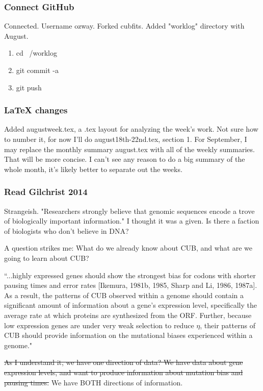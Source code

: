 \documentclass[11pt]{article} %
\begin{document}
\subsubsection{Connect GitHub}

Connected. Username ozway. Forked cubfits. Added "worklog" directory with August.

\begin{enumerate}
\item cd ~/worklog
\item git commit -a
\item git push
\end{enumerate}

\subsubsection{LaTeX changes}
Added augustweek.tex, a .tex layout for analyzing the week's work. Not sure how to number it, for now I'll do august18th-22nd.tex, section 1.
For September, I may replace the monthly summary august.tex with all of the weekly summaries. That will be more concise. I can't see any reason to do a big summary of the whole month, it's likely better to separate out the weeks.

\subsubsection{Read Gilchrist 2014}
Strangeish. "Researchers strongly believe that genomic sequences encode a trove of biologically important information." I thought it was a given. Is there a faction of biologists who don't believe in DNA?

A question strikes me: What do we already know about CUB, and what are we going to learn about CUB? 

``...highly expressed genes should show the strongest bias for codons with shorter pausing times and error rates [Ikemura, 1981b, 1985, Sharp and Li, 1986, 1987a]. As a result, the patterns of CUB observed within a genome should contain a significant amount of information about a gene’s expression level, specifically the average rate at which proteins are synthesized from the ORF. Further, because low expression genes are under very weak selection to reduce $\eta$, their patterns of CUB should provide information on the mutational biases experienced within a genome."

\sout{As I understand it, we have one direction of data? We have data about gene expression levels, and want to produce information about mutation bias and pausing times.}
We have BOTH directions of information. 
\end{document}
